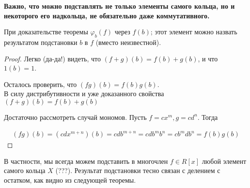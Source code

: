 \begin{normalsize}
    \textbf{Важно, что можно подставлять не только элементы самого кольца,
    но и некоторого его надкольца, не обязательно даже коммутативного.}


    При доказательстве теоремы $\varphi_b(f)$ через $f(b)$; этот элемент можно назвать результатом подстановки $b$ в $f$ (вместо неизвестной).
    
    \begin{proof}
        Легко (да-да!) видеть, что $(f+g)(b) = f(b) + g(b)$, и что $1(b) = 1$.
        
        Осталось проверить, что $(fg)(b) = f(b)g(b)$. \\
        В силу дистрибутивности и уже доказанного свойства $(f + g)(b) = f(b) + g(b)$

        Достаточно рассмотреть случай мономов. Пусть $f = cx^m, g = cd^n$. Тогда
        
        \begin{align*}
            (fg)(b) = (cdx^{m+n})(b) = cdb^{m+n} = cdb^mb^n = cb^mdb^n = f(b)g(b)
        \end{align*}
    \end{proof}

    В частности, мы всегда можем подставить в многочлен $f \in R[x]$
    любой элемент самого кольца $X$ (???). Результат подстановки тесно связан с делением с остатком, 
    как видно из следующей теоремы.






















\end{normalsize}
